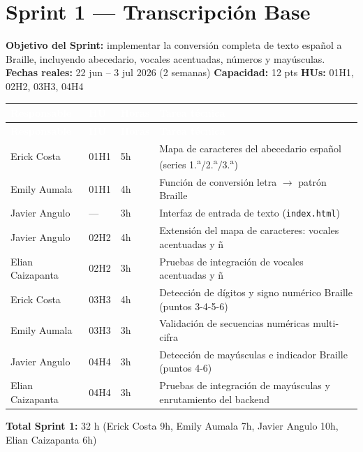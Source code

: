 \documentclass[11pt]{article}
\begin{document}

\section{Sprint 1 --- Transcripción Base}
\textbf{Objetivo del Sprint:} implementar la conversión completa de texto español a Braille, incluyendo
abecedario, vocales acentuadas, números y mayúsculas.
\quad\textbf{Fechas reales:} 22 jun -- 3 jul 2026 (2 semanas)
\quad\textbf{Capacidad:} 12 pts \quad \textbf{HUs:} 01H1, 02H2, 03H3, 04H4

\renewcommand{\arraystretch}{1.3}
\begin{longtable}{|p{3cm}|p{1cm}|p{1.1cm}|p{7.6cm}|}
\hline
\rowcolor{epnblue}
\textcolor{white}{\textbf{Responsable}} & \textcolor{white}{\textbf{HU}} & \textcolor{white}{\textbf{Horas}} & \textcolor{white}{\textbf{Tarea técnica}} \\
\hline
\endfirsthead
\hline
\rowcolor{epnblue}
\textcolor{white}{\textbf{Responsable}} & \textcolor{white}{\textbf{HU}} & \textcolor{white}{\textbf{Horas}} & \textcolor{white}{\textbf{Tarea técnica}} \\
\hline
\endhead
\rowcolor{epnrow}
Erick Costa & 01H1 & 5h & Mapa de caracteres del abecedario español (series 1.\textsuperscript{a}/2.\textsuperscript{a}/3.\textsuperscript{a}) \\
\hline
Emily Aumala & 01H1 & 4h & Función de conversión letra $\rightarrow$ patrón Braille \\
\hline
\rowcolor{epnrow}
Javier Angulo & --- & 3h & Interfaz de entrada de texto (\texttt{index.html}) \\
\hline
Javier Angulo & 02H2 & 4h & Extensión del mapa de caracteres: vocales acentuadas y ñ \\
\hline
\rowcolor{epnrow}
Elian Caizapanta & 02H2 & 3h & Pruebas de integración de vocales acentuadas y ñ \\
\hline
Erick Costa & 03H3 & 4h & Detección de dígitos y signo numérico Braille (puntos 3-4-5-6) \\
\hline
\rowcolor{epnrow}
Emily Aumala & 03H3 & 3h & Validación de secuencias numéricas multi-cifra \\
\hline
Javier Angulo & 04H4 & 3h & Detección de mayúsculas e indicador Braille (puntos 4-6) \\
\hline
\rowcolor{epnrow}
Elian Caizapanta & 04H4 & 3h & Pruebas de integración de mayúsculas y enrutamiento del backend \\
\hline
\end{longtable}
\textbf{Total Sprint 1:} 32 h (Erick Costa 9h, Emily Aumala 7h, Javier Angulo 10h, Elian Caizapanta 6h)
\end{document}
